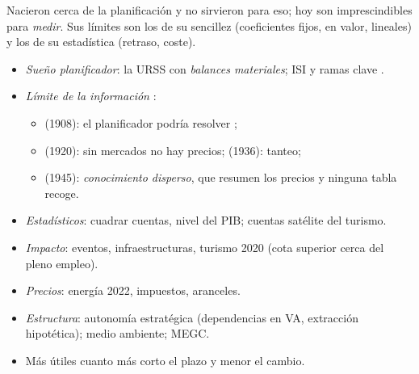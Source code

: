 \documentclass{article}
\begin{document}
\begin{columnas}
\begin{ideaclave}
Nacieron cerca de la planificación y no sirvieron para eso; hoy son imprescindibles para \emph{medir}. Sus límites son los de su sencillez (coeficientes fijos, en valor, lineales) y los de su estadística (retraso, coste).
\end{ideaclave}

\begin{itemize}
\item \emph{Sueño planificador}: la URSS con \emph{balances materiales}; ISI y ramas clave .
\item \emph{Límite de la información} :
  \begin{itemize}
  \item {} (1908): el planificador podría resolver ;
  \item {} (1920): sin mercados no hay precios;  (1936): tanteo;
  \item {} (1945): \emph{conocimiento disperso}, que resumen los precios y ninguna tabla recoge.
  \end{itemize}
\end{itemize}
\begin{itemize}
\item \emph{Estadísticos}: cuadrar cuentas, nivel del PIB; cuentas satélite del turismo.
\item \emph{Impacto}: eventos, infraestructuras, turismo 2020 (cota superior cerca del pleno empleo).
\item \emph{Precios}: energía 2022, impuestos, aranceles.
\item \emph{Estructura}: autonomía estratégica (dependencias en VA, extracción hipotética); medio ambiente; MEGC.
\item Más útiles cuanto más corto el plazo y menor el cambio.
\end{itemize}


\end{columnas}
\end{document}
